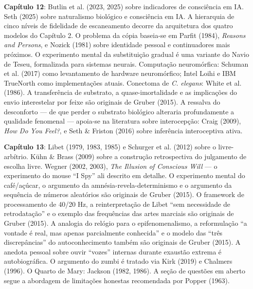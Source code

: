 \documentclass[11pt, twoside, openright]{book}
\begin{document}
\textbf{Capítulo 12}: Butlin et al. (2023, 2025) sobre indicadores de consciência em IA. Seth (2025) sobre naturalismo biológico e consciência em IA. A hierarquia de cinco níveis de fidelidade de escaneamento decorre da arquitetura dos quatro modelos do Capítulo 2. O problema da cópia baseia-se em Parfit (1984), \textit{Reasons and Persons}, e Nozick (1981) sobre identidade pessoal e continuadores mais próximos. O experimento mental da substituição gradual é uma variante do Navio de Teseu, formalizada para sistemas neurais. Computação neuromórfica: Schuman et al. (2017) como levantamento de hardware neuromórfico; Intel Loihi e IBM TrueNorth como implementações atuais. Conectoma de \textit{C. elegans}: White et al. (1986). A transferência de substrato, a quase-imortalidade e as implicações do envio interestelar por feixe são originais de Gruber (2015). A ressalva do desconforto --- de que perder o substrato biológico alteraria profundamente a qualidade fenomenal --- apoia-se na literatura sobre interocepção: Craig (2009), \textit{How Do You Feel?}, e Seth \& Friston (2016) sobre inferência interoceptiva ativa.

\textbf{Capítulo 13}: Libet (1979, 1983, 1985) e Schurger et al. (2012) sobre o livre-arbítrio. Kühn \& Brass (2009) sobre a construção retrospectiva do julgamento de escolha livre. Wegner (2002, 2003), \textit{The Illusion of Conscious Will} --- o experimento do mouse ``I Spy'' ali descrito em detalhe. O experimento mental do café/\allowbreak{}açúcar, o argumento da amnésia-revela-determinismo e o argumento da sequência de números aleatórios são originais de Gruber (2015). O framework de processamento de 40/\allowbreak{}20 Hz, a reinterpretação de Libet ``sem necessidade de retrodatação'' e o exemplo das frequências das artes marciais são originais de Gruber (2015). A analogia do relógio para o epifenomenalismo, a reformulação ``a vontade é real, mas apenas parcialmente conhecida'' e o modelo das ``três discrepâncias'' do autoconhecimento também são originais de Gruber (2015). A anedota pessoal sobre ouvir ``vozes'' internas durante exaustão extrema é autobiográfica. O argumento do zumbi é tratado via Kirk (2019) e Chalmers (1996). O Quarto de Mary: Jackson (1982, 1986). A seção de questões em aberto segue a abordagem de limitações honestas recomendada por Popper (1963).
\end{document}
